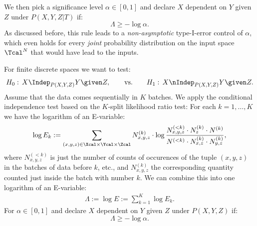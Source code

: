 We then pick a significance level $\alpha \in [0,1]$ and declare $X$ dependent on $Y$ given $Z$ under $P(X,Y,Z|T)$ if:
\[ \Lambda \ge - \log \alpha.  \]
As discussed before, this rule leads to a \emph{non-asymptotic} type-I-error control of $\alpha$, 
which even holds for every \emph{joint} probability distribution on the input space $\Tcal^N$ that would have lead to the inputs.


For finite discrete spaces we want to test:
\[ H_0:\, X \Indep_{P(X,Y,Z)} Y \given Z, \qquad \text{vs.} \qquad H_1:\,X \nIndep_{P(X,Y,Z)} Y \given Z. \]
Assume that the data comes sequentially in $K$ batches.
We apply the conditional independence test based on the $K$-split likelihood ratio test:
For each $k=1,\dots,K$ we have the logarithm of an E-variable:
\begin{align*}
     \log E_k := \sum_{(x,y,z) \in \Xcal\times\Ycal\times\Zcal}  N^{(k)}_{x,y,z} \cdot  \log \frac{N_{x,y,z}^{(<k)} \cdot N_z^{(k)} \cdot N^{(k)}}{N^{(<k)} \cdot N_{x,z}^{(k)} \cdot N_{y,z}^{(k)}},
\end{align*}
where $N_{x,y,z}^{(<k)}$ is just the number of counts of occurences of the tuple $(x,y,z)$ in the batches of data before $k$, etc., and $N_{x,y,z}^{(k)}$ the corresponding quantity counted just inside the batch with number $k$.
We can combine this into one logarithm of an E-variable:
\begin{align*}
    \Lambda := \log E :=  \sum_{k=1}^K \log E_k.
\end{align*}
For $\alpha \in [0,1]$ and declare $X$ dependent on $Y$ given $Z$ under $P(X,Y,Z)$ if:
\[ \Lambda \ge - \log \alpha.  \]


